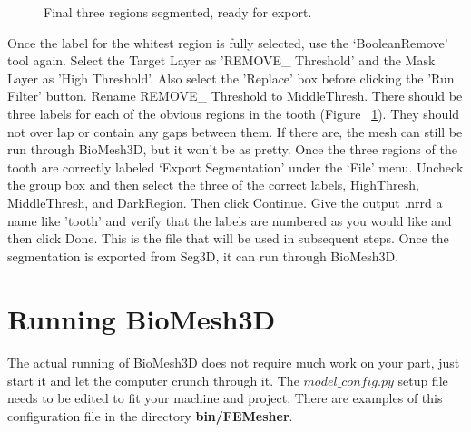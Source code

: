 \documentclass[fleqn,12pt,openany]{book}
\begin{document}
\begin{figure}
\caption{\label{fig:tooth_3types} Final three regions segmented, ready for export.}
\end{figure} 

Once the label for the whitest region is fully selected, use the `BooleanRemove' tool again.  
Select the Target Layer as 'REMOVE\_ Threshold' and the Mask Layer as 'High Threshold'.  Also
select the 'Replace' box before clicking the 'Run Filter' button.  Rename REMOVE\_ Threshold to MiddleThresh.  There should be three labels for each of 
the obvious regions in the tooth (Figure ~\ref{fig:tooth_3types}).  They should 
not over lap or contain any gaps between them.  If there are, the mesh can still 
be run through BioMesh3D, but it won't be as pretty.  Once the three regions of 
the tooth are correctly labeled `Export Segmentation' under the `File' menu.  
Uncheck the group box and then select the three of the correct labels, HighThresh, MiddleThresh, and DarkRegion.  Then click Continue.  Give the output .nrrd a name like 'tooth' and verify that the labels are numbered as you would like and then click Done.
This is the file that will be used in subsequent steps.  Once the segmentation 
is exported from Seg3D, it can run through BioMesh3D.


 

\section{Running BioMesh3D}

\paragraph{}
The actual running of BioMesh3D does not require much work on your part, just 
start it and let the computer crunch through it.  The $model\_config.py$ setup 
file needs to be edited to fit your machine and project.  There are examples 
of this configuration file in the directory \textbf{bin/FEMesher}.
\newline
 
\end{document}
